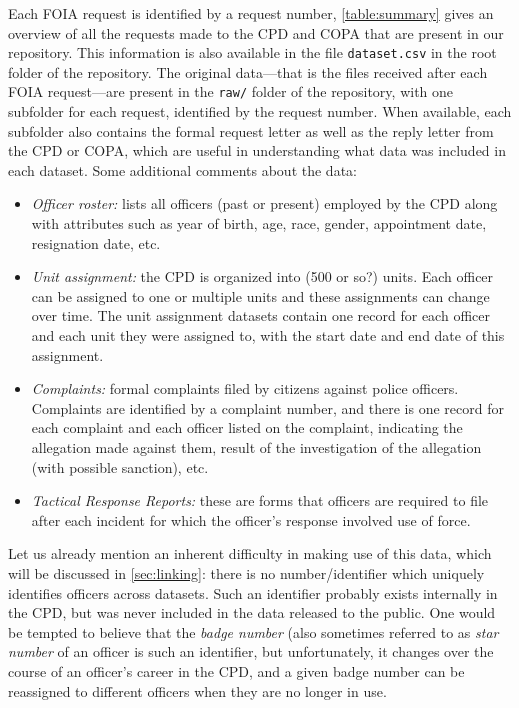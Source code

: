 Each FOIA request is identified by a request number, \cref{table:summary} gives
an overview of all the requests made to the CPD and COPA that are present in
our repository. This information is also available in the file
\texttt{dataset.csv} in the root folder of the repository. The original
data—that is the files received after each FOIA request—are present in the
\texttt{raw/} folder of the repository, with one subfolder for each request,
identified by the request number. When available, each subfolder also contains
the formal request letter as well as the reply letter from the CPD or COPA,
which are useful in understanding what data was included in each dataset.
Some additional comments about the data:
\begin{itemize}
	\item \emph{Officer roster:} lists all officers (past or present) employed
		by the CPD along with attributes such as year of birth, age, race,
		gender, appointment date, resignation date, etc.
	\item \emph{Unit assignment:} the CPD is organized into (500 or so?) units.
		Each officer can be assigned to one or multiple units and these
		assignments can change over time. The unit assignment datasets contain
		one record for each officer and each unit they were assigned to, with
		the start date and end date of this assignment.
	\item \emph{Complaints:} formal complaints filed by citizens against police
		officers. Complaints are identified by a complaint number, and there is
		one record for each complaint and each officer listed on the complaint,
		indicating the allegation made against them, result of the
		investigation of the allegation (with possible sanction), etc.
	\item \emph{Tactical Response Reports:} these are forms that officers are
		required to file after each incident for which the officer's response
		involved use of force.
\end{itemize}

Let us already mention an inherent difficulty in making use of this data, which
will be discussed in \cref{sec:linking}: there is no number/identifier which
uniquely identifies officers across datasets. Such an identifier probably
exists internally in the CPD, but was never included in the data released to
the public. One would be tempted to believe that the \emph{badge number} (also
sometimes referred to as \emph{star number} of an officer is such an
identifier, but unfortunately, it changes over the course of an officer's
career in the CPD, and a given badge number can be reassigned to different
officers when they are no longer in use.


